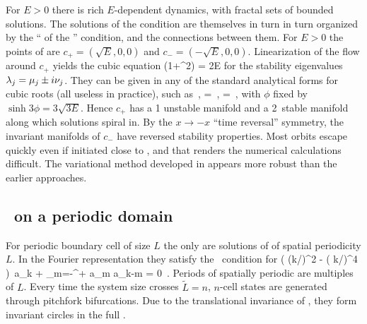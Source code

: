 For $E>0$ there is rich
$E$-dependent dynamics, with
fractal sets of bounded solutions.
The solutions of the {\eqv}  condition 
 are themselves in turn  in turn organized by the  
``{\eqva}  of the {\eqv}''  condition, and 
the connections between them.
    For $E>0$ the {\eqv}  points of  are
$c_{+}=(\sqrt{E},0,0)$ and $c_{-}=(-\sqrt{E},0,0)$.
Linearization of the flow around
$c_{+}$ yields the cubic equation
  \beq
\eigExp(1+\eigExp^2) = 2E
for the 
stability eigenvalues 
$\eigExp[j] = \eigRe[j] \pm i \eigIm[j]$.
They can
be given in any of the standard analytical forms for cubic
roots  (all useless in practice), such as
    \,,\qquad
\eigRe=\sinh \phi
\,,\qquad
\eigIm=\cosh \phi \, ,
with $\phi$ fixed by $\sinh 3\phi=3\sqrt{3E}$. 
Hence $c_{+}$ has a {1\dmn}
unstable manifold and a 2\dmn\ stable manifold 
along which solutions spiral in. 
By the $x \to -x$ ``time reversal'' symmetry, the 
invariant manifolds of $c_{-}$ 
have reversed stability properties.
Most orbits escape quickly even if initiated close to \eqva, and that
renders the numerical calculations 
difficult.
The variational method
developed in 
appears more robust than
the earlier approaches.

\subsection{\Eqva\ on a periodic domain}

For periodic boundary cell of size 
$L$ the only {\eqva}  are
solutions of  of spatial periodicity $L$.
In the Fourier representation they satisfy 
the \eqv\ condition for 
\beq
( (k/\tildeL)^2 - ( k/\tildeL)^4 )\, a_k 
    +   \sum_{m=-\infty}^{+\infty} a_m a_{k-m}
  = 0
\,.
\label{eq:stfks}
\eeq 
Periods of spatially periodic {\eqva} are multiples of $L$.
Every time the system size crosses  $\tilde{L}=n$,
$n$-cell states
are generated through pitchfork bifurcations. 
Due to the translational invariance of {\KSe},
they form invariant circles
in the full \statesp.


